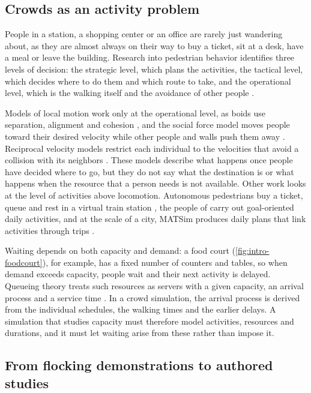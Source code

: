 \subsection{Crowds as an activity problem}\label{sub:intro-activity}

People in a station, a shopping center or an office are rarely just wandering about, as they are almost always on their way to buy a ticket, sit at a desk, have a meal or leave the building. Research into pedestrian behavior identifies three levels of decision: the strategic level, which plans the activities, the tactical level, which decides where to do them and which route to take, and the operational level, which is the walking itself and the avoidance of other people \citep{hoogendoorn2004pedestrian}.

Models of local motion work only at the operational level, as boids use separation, alignment and cohesion \citep{reynolds1987flocks}, and the social force model moves people toward their desired velocity while other people and walls push them away \citep{helbing1995social}. Reciprocal velocity models restrict each individual to the velocities that avoid a collision with its neighbors \citep{vandenberg2011reciprocal}. These models describe what happens once people have decided where to go, but they do not say what the destination is or what happens when the resource that a person needs is not available. Other work looks at the level of activities above locomotion. Autonomous pedestrians buy a ticket, queue and rest in a virtual train station \citep{shao2007autonomous}, the people of \citet{paris2009activity} carry out goal-oriented daily activities, and at the scale of a city, MATSim produces daily plans that link activities through trips \citep{horni2016matsim}.

Waiting depends on both capacity and demand: a food court (\cref{fig:intro-foodcourt}), for example, has a fixed number of counters and tables, so when demand exceeds capacity, people wait and their next activity is delayed. Queueing theory treats such resources as servers with a given capacity, an arrival process and a service time \citep{kendall1953stochastic,shortle2018fundamentals}. In a crowd simulation, the arrival process is derived from the individual schedules, the walking times and the earlier delays. A simulation that studies capacity must therefore model activities, resources and durations, and it must let waiting arise from these rather than impose it.

\subsection{From flocking demonstrations to authored studies}\label{sub:intro-authoring}

